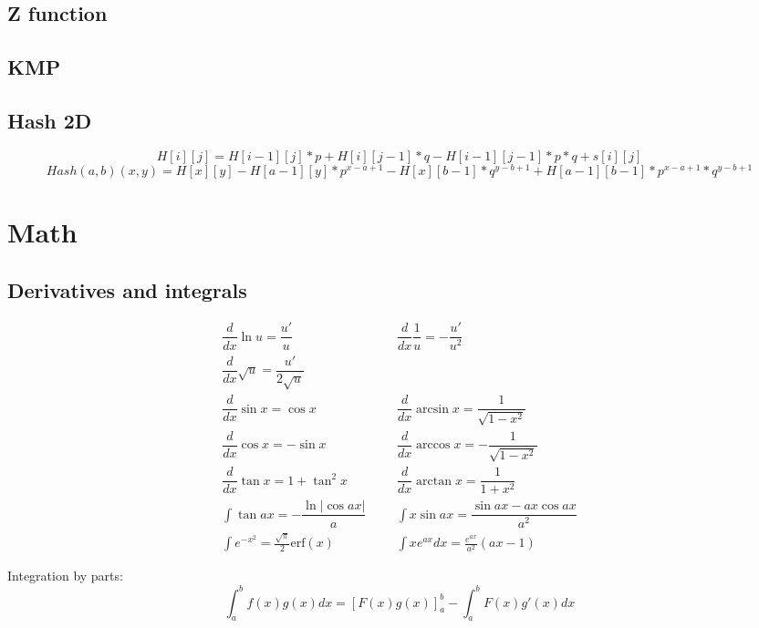 \documentclass[A4 paper, 12pt, oneside]{article}
\begin{document}
\begin{landscape}
\begin{multicols}{2}
	\subsection{Z function}
	
	
	\subsection{KMP}
	
	
	\subsection{Hash 2D}
	\begin{dmath}
	H[i][j] = H[i - 1][j] * p + H[i][j - 1] * q - H[i - 1][j - 1] * p * q + s[i][j]
	\end{dmath}
	\begin{dmath}
	Hash(a,b)(x,y) = H[x][y] - H[a - 1][y]*p^{x - a + 1} - H[x][b - 1]*q^{y - b + 1} + H[a - 1][b - 1] * p^{x - a + 1} * q^{y - b + 1}
	\end{dmath}

\section{Math}	
	\subsection{Derivatives and integrals}
	\begin{align*}
        \dfrac{d}{dx}\ln{u} = \dfrac{u'}{u} &&& \dfrac{d}{dx}\dfrac{1}{u} = -\dfrac{u'}{u^2} \\
    	\dfrac{d}{dx}\sqrt u = \dfrac{u'}{2\sqrt u} \\
    	\dfrac{d}{dx}\sin x = \cos x &&& \dfrac{d}{dx}\arcsin x = \dfrac{1}{\sqrt{1-x^2}} \\ 
    	\dfrac{d}{dx}\cos x = -\sin x &&& \dfrac{d}{dx}\arccos x = -\dfrac{1}{\sqrt{1-x^2}} \\
    	\dfrac{d}{dx}\tan x = 1+\tan^2 x &&& \dfrac{d}{dx}\arctan x = \dfrac{1}{1+x^2} \\
    	\int\tan ax = -\dfrac{\ln|\cos ax|}{a} &&& \int x\sin ax = \dfrac{\sin ax-ax \cos ax}{a^2} \\
    	\int e^{-x^2} = \frac{\sqrt \pi}{2} \text{erf}(x) &&& \int xe^{ax}dx = \frac{e^{ax}}{a^2}(ax-1)
	\end{align*}

    Integration by parts:
    \[\int_a^bf(x)g(x)dx = [F(x)g(x)]_a^b-\int_a^bF(x)g'(x)dx\]	
	

\end{multicols}
\end{landscape}
\end{document}
